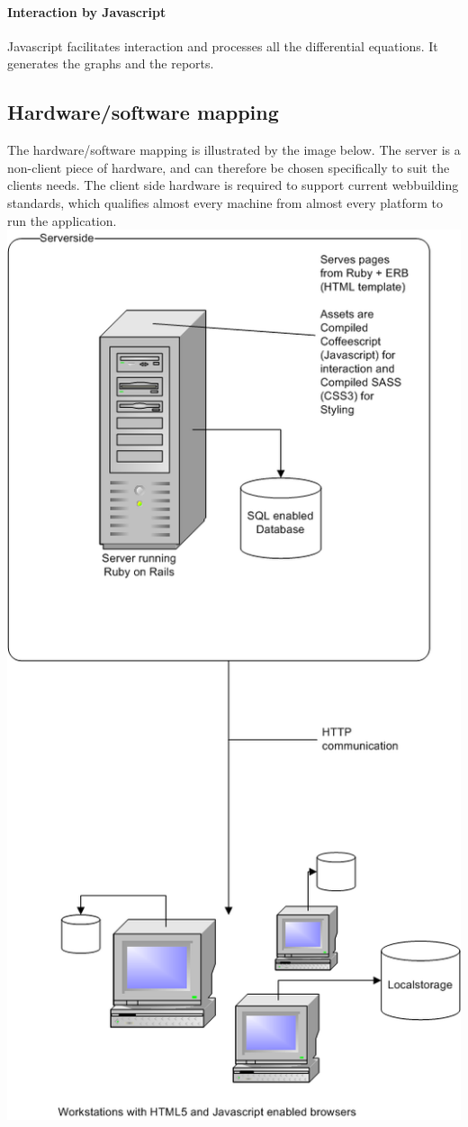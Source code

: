 \documentclass{report}
\begin{document}
				\paragraph{Interaction by Javascript}
					Javascript facilitates interaction and processes all the differential equations. It generates the graphs and the reports. 
		\subsection{Hardware/software mapping}
			The hardware/software mapping is illustrated by the image below. The server is a non-client piece of hardware, and can therefore be chosen specifically to suit the clients needs. The client side hardware is required to support current webbuilding standards, which qualifies almost every machine from almost every platform to run the application.\\
			\includegraphics[width=16cm]{EAD.png}
\end{document}
